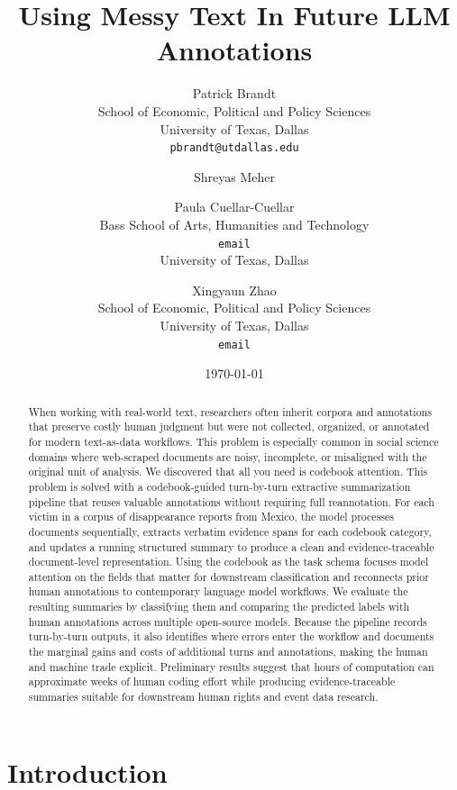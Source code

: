 \documentclass{article}
\title{Using Messy Text In  Future LLM Annotations}
\author{Patrick Brandt \\ School of Economic, Political and Policy Sciences \\ University of Texas, Dallas\\ \texttt{pbrandt@utdallas.edu}
\and Shreyas Meher 
\and Paula Cuellar-Cuellar \\ Bass School of Arts, Humanities and Technology \\ \texttt{email}  \\ University of Texas, Dallas\\
\and Xingyaun Zhao \\ School of Economic, Political and Policy Sciences \\ University of Texas, Dallas\\ \texttt{email}}
\date{\today}
\begin{document}
\maketitle
\begin{abstract}



When working with real-world text, researchers often inherit corpora and annotations that preserve costly human judgment but were not collected, organized, or annotated for modern text-as-data workflows. This problem is especially common in social science domains where web-scraped documents are noisy, incomplete, or misaligned with the original unit of analysis.
We discovered that all you need is codebook attention. This problem is solved with a codebook-guided turn-by-turn extractive summarization pipeline that reuses valuable annotations without requiring full reannotation. For each victim in a corpus of disappearance reports from Mexico, the model processes documents sequentially, extracts verbatim evidence spans for each codebook category, and updates a running structured summary to produce a clean and evidence-traceable document-level representation. Using the codebook as the task schema focuses model attention on the fields that matter for downstream classification and reconnects prior human annotations to contemporary language model workflows. We evaluate the resulting summaries by classifying them and comparing the predicted labels with human annotations across multiple open-source models. Because the pipeline records turn-by-turn outputs, it also identifies where errors enter the workflow and documents the marginal gains and costs of additional turns and annotations, making the human and machine trade explicit. Preliminary results suggest that hours of computation can approximate weeks of human coding effort while producing evidence-traceable summaries suitable for downstream human rights and event data research.

\end{abstract}

\section{Introduction}\label{introduction}
\end{document}
